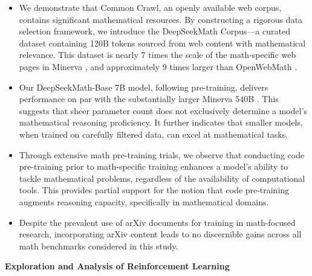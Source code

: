 \begin{itemize}[topsep=0pt]
    \item We demonstrate that Common Crawl, an openly available web corpus, contains significant mathematical resources. By constructing a rigorous data selection framework, we introduce the DeepSeekMath Corpus—a curated dataset containing 120B tokens sourced from web content with mathematical relevance. This dataset is nearly 7 times the scale of the math-specific web pages in Minerva \citep{minerva}, and approximately 9 times larger than OpenWebMath \citep{openwebmath}.

    \item Our DeepSeekMath-Base 7B model, following pre-training, delivers performance on par with the substantially larger Minerva 540B \citep{minerva}. This suggests that sheer parameter count does not exclusively determine a model's mathematical reasoning proficiency. It further indicates that smaller models, when trained on carefully filtered data, can excel at mathematical tasks.

    \item Through extensive math pre-training trials, we observe that conducting code pre-training prior to math-specific training enhances a model’s ability to tackle mathematical problems, regardless of the availability of computational tools. This provides partial support for the notion that code pre-training augments reasoning capacity, specifically in mathematical domains.

    \item Despite the prevalent use of arXiv documents for training in math-focused research, incorporating arXiv content leads to no discernible gains across all math benchmarks considered in this study.
\end{itemize}

\textbf{Exploration and Analysis of Reinforcement Learning}

